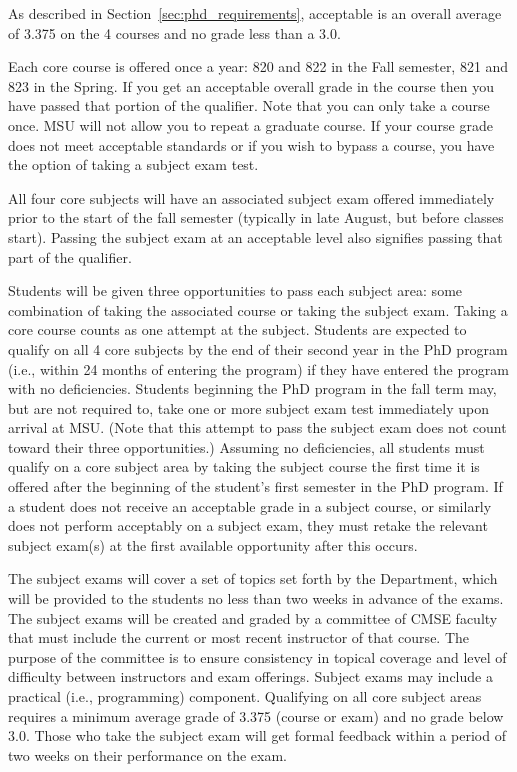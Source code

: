 As described in Section~\ref{sec:phd_requirements}, acceptable is an
overall average of 3.375 on the 4 courses and no grade less than a
3.0. 

Each core course is offered once a year: 820 and 822 in the Fall
semester, 821 and 823 in the Spring. If you get an acceptable overall
grade in the course then you have passed that portion of the qualifier.
Note that you can only take a course once. MSU will not allow you to
repeat a graduate course. If your course grade does not meet
acceptable standards or if you wish to bypass a course, you have the
option of taking a subject exam test.

All four core subjects will have an associated subject exam offered
immediately prior to the start of the fall semester (typically in late
August, but before classes start). Passing the subject exam at an
acceptable level also signifies passing that part of the qualifier.

Students will be given three opportunities to pass each subject area:
some combination of taking the associated course or taking the subject
exam. Taking a core course counts as one attempt at the subject.
Students are expected to qualify on all 4 core subjects by the end of
their second year in the PhD program (i.e., within 24 months of
entering the program) if they have entered the program with no
deficiencies.  Students beginning the PhD program in the fall term
may, but are not required to, take one or more subject exam test
immediately upon arrival at MSU.  (Note that this attempt to pass the
subject exam does not count toward their three opportunities.)
Assuming no deficiencies, all students must qualify on a core subject
area by taking the subject course the first time it is offered after
the beginning of the student's first semester in the PhD program.  If
a student does not receive an acceptable grade in a subject course, or
similarly does not perform acceptably on a subject exam, they must
retake the relevant subject exam(s) at the first available opportunity
after this occurs.

The subject exams will cover a set of topics set forth by the
Department, which will be provided to the students no less than two
weeks in advance of the exams. The subject exams will be created and
graded by a committee of CMSE faculty that must include the current or
most recent instructor of that course.  The purpose of the committee
is to ensure consistency in topical coverage and level of difficulty
between instructors and exam offerings.  Subject exams may include a
practical (i.e., programming) component. Qualifying on all core
subject areas requires a minimum average grade of 3.375 (course or
exam) and no grade below 3.0. Those who take the subject exam will get
formal feedback within a period of two weeks on their performance on
the exam.

